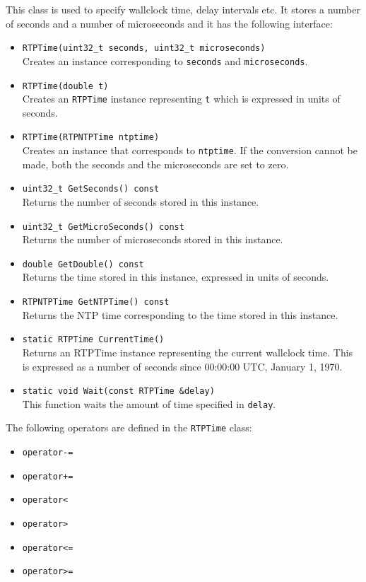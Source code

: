 \documentclass[12pt,a4paper]{article}
\begin{document}
					This class is used to specify wallclock time, delay intervals
					etc. It stores a number of seconds and a number of microseconds and
					it has the following interface:
					\begin{itemize}
						\item {\tt RTPTime(uint32\_t seconds, uint32\_t microseconds)}\\
							Creates an instance corresponding to {\tt seconds} and
							{\tt microseconds}.
						\item {\tt RTPTime(double t)}\\
							Creates an {\tt RTPTime} instance representing {\tt t} which
							is expressed in units of seconds.
						\item {\tt RTPTime(RTPNTPTime ntptime)}\\
							Creates an instance that corresponds to {\tt ntptime}. If
							the conversion cannot be made, both the seconds and the
							microseconds are set to zero.
						\item {\tt uint32\_t GetSeconds() const}\\
							Returns the number of seconds stored in this instance.
						\item {\tt uint32\_t GetMicroSeconds() const}\\
							Returns the number of microseconds stored in this instance.
						\item {\tt double GetDouble() const}\\
							Returns the time stored in this instance, expressed in
							units of seconds.
						\item {\tt RTPNTPTime GetNTPTime() const}\\
							Returns the NTP time corresponding to the time stored in
							this instance.
						\item {\tt static RTPTime CurrentTime()}\\
							Returns an RTPTime instance representing the current
							wallclock time. This is expressed as a number of seconds
							since 00:00:00 UTC, January 1, 1970.
						\item {\tt static void Wait(const RTPTime \&delay)}\\
							This function waits the amount of time specified in
							{\tt delay}.
					\end{itemize}

					The following operators are defined in the {\tt RTPTime} class:
					\begin{itemize}
						\item {\tt operator-=}
						\item {\tt operator+=}
						\item {\tt operator<}
						\item {\tt operator>}
						\item {\tt operator<=}
						\item {\tt operator>=}
					\end{itemize}
\end{document}
